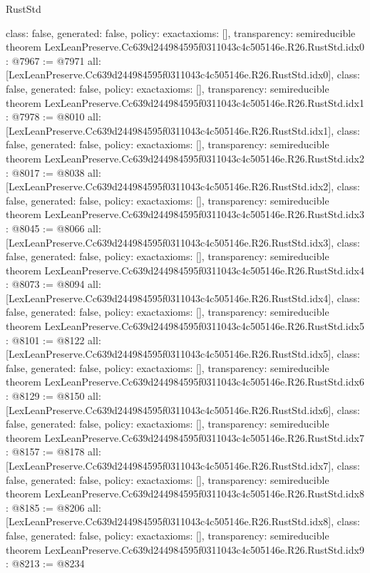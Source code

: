 \begin{lexlean}{RustStd}
\begin{coremodule}
{  class: false,
  generated: false,
  policy: exact{axioms: []},
  transparency: semireducible
}
theorem LexLeanPreserve.Cc639d244984595f0311043c4c505146e.R26.RustStd.idx0 : @7967 := @7971 {
  all: [LexLeanPreserve.Cc639d244984595f0311043c4c505146e.R26.RustStd.idx0],
  class: false,
  generated: false,
  policy: exact{axioms: []},
  transparency: semireducible
}
theorem LexLeanPreserve.Cc639d244984595f0311043c4c505146e.R26.RustStd.idx1 : @7978 := @8010 {
  all: [LexLeanPreserve.Cc639d244984595f0311043c4c505146e.R26.RustStd.idx1],
  class: false,
  generated: false,
  policy: exact{axioms: []},
  transparency: semireducible
}
theorem LexLeanPreserve.Cc639d244984595f0311043c4c505146e.R26.RustStd.idx2 : @8017 := @8038 {
  all: [LexLeanPreserve.Cc639d244984595f0311043c4c505146e.R26.RustStd.idx2],
  class: false,
  generated: false,
  policy: exact{axioms: []},
  transparency: semireducible
}
theorem LexLeanPreserve.Cc639d244984595f0311043c4c505146e.R26.RustStd.idx3 : @8045 := @8066 {
  all: [LexLeanPreserve.Cc639d244984595f0311043c4c505146e.R26.RustStd.idx3],
  class: false,
  generated: false,
  policy: exact{axioms: []},
  transparency: semireducible
}
theorem LexLeanPreserve.Cc639d244984595f0311043c4c505146e.R26.RustStd.idx4 : @8073 := @8094 {
  all: [LexLeanPreserve.Cc639d244984595f0311043c4c505146e.R26.RustStd.idx4],
  class: false,
  generated: false,
  policy: exact{axioms: []},
  transparency: semireducible
}
theorem LexLeanPreserve.Cc639d244984595f0311043c4c505146e.R26.RustStd.idx5 : @8101 := @8122 {
  all: [LexLeanPreserve.Cc639d244984595f0311043c4c505146e.R26.RustStd.idx5],
  class: false,
  generated: false,
  policy: exact{axioms: []},
  transparency: semireducible
}
theorem LexLeanPreserve.Cc639d244984595f0311043c4c505146e.R26.RustStd.idx6 : @8129 := @8150 {
  all: [LexLeanPreserve.Cc639d244984595f0311043c4c505146e.R26.RustStd.idx6],
  class: false,
  generated: false,
  policy: exact{axioms: []},
  transparency: semireducible
}
theorem LexLeanPreserve.Cc639d244984595f0311043c4c505146e.R26.RustStd.idx7 : @8157 := @8178 {
  all: [LexLeanPreserve.Cc639d244984595f0311043c4c505146e.R26.RustStd.idx7],
  class: false,
  generated: false,
  policy: exact{axioms: []},
  transparency: semireducible
}
theorem LexLeanPreserve.Cc639d244984595f0311043c4c505146e.R26.RustStd.idx8 : @8185 := @8206 {
  all: [LexLeanPreserve.Cc639d244984595f0311043c4c505146e.R26.RustStd.idx8],
  class: false,
  generated: false,
  policy: exact{axioms: []},
  transparency: semireducible
}
theorem LexLeanPreserve.Cc639d244984595f0311043c4c505146e.R26.RustStd.idx9 : @8213 := @8234 {
}
\end{coremodule}
\end{lexlean}
